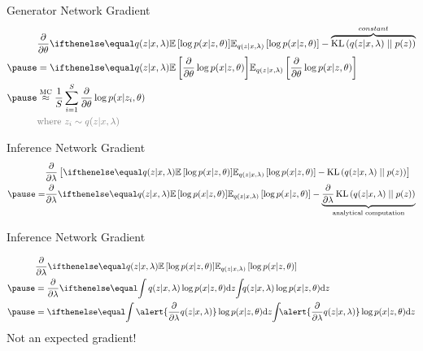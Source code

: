 \documentclass[14pt]{beamer}
\begin{document}
\begin{frame}{Generator Network Gradient}
\vspace{-10pt}
\begin{equation*}
\begin{aligned}
&\pdv{\theta}\E[q(z|x,\lambda)]{\log p(x|z,\theta)} - \overbrace{\KL{q(z|x,\lambda)}{p(z)}}^{constant} \\ \pause 
&=\E[q(z|x,\lambda)]{\pdv{\theta}\log p(x|z,\theta)} \\ \pause
&\overset{\text{MC}}{\approx} \frac{1}{S}\sum_{i=1}^{S}
\pdv{\theta} \log p(x|z_{i},\theta) \\
&\textcolor{gray}{\text{where }z_i \sim q(z|x, \lambda)}
\end{aligned}
\end{equation*}
\pause
{}
\end{frame}

\begin{frame}{Inference Network Gradient}
\begin{equation*}
\begin{aligned}
&\pdv{\lambda}\left[\E[q(z|x,\lambda)]{\log p(x|z,\theta)} - \KL{q(z|x,\lambda)}{p(z)} \right] \\ \pause
=&\pdv{\lambda}\E[q(z|x,\lambda)]{\log p(x|z,\theta)} - \underbrace{\pdv{\lambda}\KL{q(z|x,\lambda)}{p(z)}}_{\text{analytical computation}} \\
\end{aligned}
\end{equation*}
\pause
{}
\end{frame}

\begin{frame}{Inference Network Gradient}


\begin{equation*}
\begin{aligned}
&\pdv{\lambda}\E[q(z|x,\lambda)]{\log p(x|z,\theta)} \\ \pause
&= \pdv{\lambda} \intl{q(z|x,\lambda)\log p(x|z,\theta)}{z} \\ \pause
&= \intl{\alert{\pdv{\lambda} q(z|x,\lambda)}\log p(x|z,\theta)}{z}
\end{aligned}
\end{equation*}
\pause
Not an expected gradient!
\end{frame}
\end{document}
